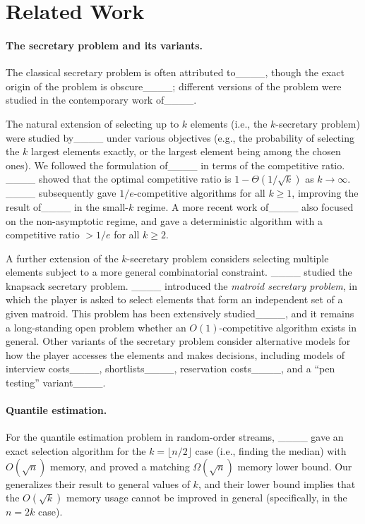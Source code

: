\section{Related Work}
\paragraph{The secretary problem and its variants.} 
The classical secretary problem is often attributed to____, though the exact origin of the problem is obscure____; different versions of the problem were studied in the contemporary work of____. 

The natural extension of selecting up to $k$ elements (i.e., the $k$-secretary problem) were studied by____ under various objectives (e.g., the probability of selecting the $k$ largest elements exactly, or the largest element being among the chosen ones). We followed the formulation of____ in terms of the competitive ratio. ____ showed that the optimal competitive ratio is $1 - \Theta(1/\sqrt{k})$ as $k \to \infty$. ____ subsequently gave $1/e$-competitive algorithms for all $k \ge 1$, improving the result of____ in the small-$k$ regime. A more recent work of____ also focused on the non-asymptotic regime, and gave a deterministic algorithm with a competitive ratio $> 1/e$ for all $k \ge 2$.

A further extension of the $k$-secretary problem considers selecting multiple elements subject to a more general combinatorial constraint. ____ studied the knapsack secretary problem. ____ introduced the \emph{matroid secretary problem}, in which the player is asked to select elements that form an independent set of a given matroid. This problem has been extensively studied____, and it remains a long-standing open problem whether an $O(1)$-competitive algorithm exists in general. Other variants of the secretary problem consider alternative models for how the player accesses the elements and makes decisions, including models of interview costs____, shortlists____, reservation costs____, and a ``pen testing'' variant____.

\paragraph{Quantile estimation.} For the quantile estimation problem in random-order streams, ____ gave an exact selection algorithm for the $k = \lfloor n/2\rfloor$ case (i.e., finding the median) with $O(\sqrt{n})$ memory, and proved a matching $\Omega(\sqrt{n})$ memory lower bound. Our  generalizes their result to general values of $k$, and their lower bound implies that the $O(\sqrt{k})$ memory usage cannot be improved in general (specifically, in the $n = 2k$ case).

